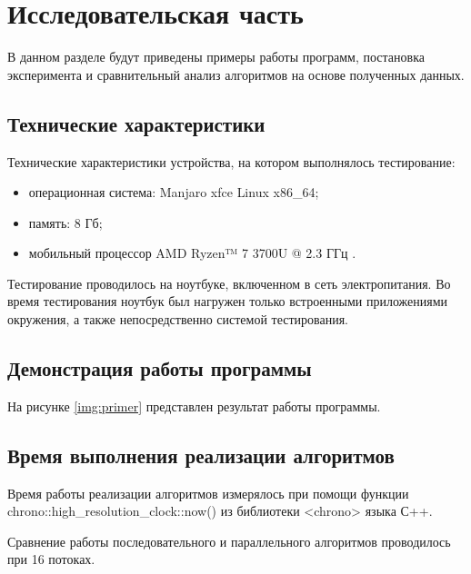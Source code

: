 \chapter{Исследовательская часть}

В данном разделе будут приведены примеры работы программ, постановка эксперимента и сравнительный анализ алгоритмов на основе полученных данных.

\section{Технические характеристики}

Технические характеристики устройства, на котором выполнялось тестирование:

\begin{itemize}
	\item операционная система: Manjaro xfce \cite{ubuntu} Linux \cite{linux} x86\_64;
	\item память: 8 Гб;
	\item мобильный процессор AMD Ryzen™ 7 3700U @ 2.3 ГГц \cite{intel}.
\end{itemize}

Тестирование проводилось на ноутбуке, включенном в сеть электропитания. Во время тестирования ноутбук был нагружен только встроенными приложениями окружения, а также непосредственно системой тестирования.

\section{Демонстрация работы программы}

На рисунке \ref{img:primer} представлен результат работы программы.

\FloatBarrier

\section{Время выполнения реализации алгоритмов}

Время работы реализации алгоритмов измерялось при помощи функции chrono::high\_resolution\_clock::now() из библиотеки <chrono> языка С++.

Сравнение работы последовательного и параллельного алгоритмов проводилось при 16 потоках.

